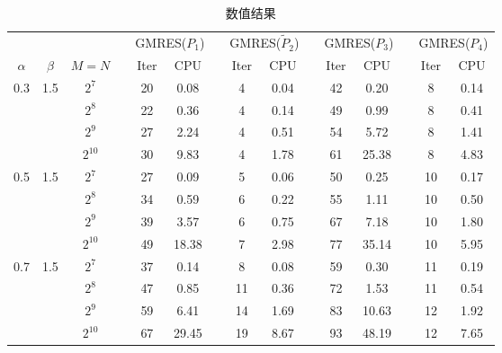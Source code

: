\documentclass{ecnumaster}
\begin{document}
\begin{table}[H]
\centering
\caption{数值结果} \label{tab4-4-5}\smallskip
\begin{tabular}{ccccccccccccccc} \toprule
& &  && \multicolumn{2}{c}{GMRES($P_1$)}
&& \multicolumn{2}{c}{GMRES($\tilde{P}_2$)}
&& \multicolumn{2}{c}{GMRES($P_3$)}
&& \multicolumn{2}{c}{GMRES($P_4$)} \\
$\alpha$ & $\beta$ & $M = N$ && Iter & CPU && Iter & CPU
&& Iter & CPU && Iter & CPU\\ \midrule
0.3 & 1.5
 & $2^7$     && 20 & 0.08 && 4 & 0.04 && 42 & 0.20 && 8 & 0.14\\
&& $2^8$     && 22 & 0.36 && 4 & 0.14 && 49 & 0.99 && 8 & 0.41 \\
&& $2^9$     && 27 & 2.24 && 4 & 0.51 && 54 & 5.72 && 8 & 1.41 \\
&& $2^{10}$  && 30 & 9.83 && 4 & 1.78 && 61 & 25.38 && 8 & 4.83 \\ \midrule
0.5 & 1.5
 & $2^7$     && 27 & 0.09 && 5 & 0.06 && 50 & 0.25 && 10 & 0.17 \\
&& $2^8$     && 34 & 0.59 && 6 & 0.22 && 55 & 1.11 && 10 & 0.50 \\
&& $2^9$     && 39 & 3.57 && 6 & 0.75 && 67 & 7.18 && 10 & 1.80 \\
&& $2^{10}$  && 49 & 18.38 && 7 & 2.98 && 77 & 35.14 && 10 & 5.95 \\ \midrule
0.7 & 1.5
 & $2^7$     && 37 & 0.14 && 8 & 0.08 && 59 & 0.30 && 11 & 0.19 \\
&& $2^8$     && 47 & 0.85 && 11 & 0.36 && 72 & 1.53 && 11 & 0.54 \\
&& $2^9$     && 59 & 6.41 && 14 & 1.69 && 83 & 10.63 && 12 & 1.92 \\
&& $2^{10}$  && 67 & 29.45 && 19 & 8.67 && 93 & 48.19 && 12 & 7.65 \\ \bottomrule
\end{tabular}
\end{table}
\end{document}
